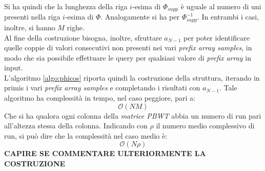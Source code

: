 Si ha quindi che la lunghezza della riga $i$-esima di $\varPhi_{supp}$ è
uguale al numero di uni presenti nella riga $i$-esima di $\varPhi$. Analogamente
si ha per $\varPhi^{-1}_{supp}$. In entrambi i casi, inoltre, si hanno $M$
righe.\\ 
Al fine della costruzione bisogna, inoltre, sfruttare $a_{N-1}$ per poter
identificare quelle coppie di valori consecutivi non presenti nei vari
\textit{prefix array samples}, in modo che sia possibile effettuare le query per
qualsiasi valore di \textit{prefix array} in input.\\
L'algoritmo \ref{algo:phicos} riporta quindi la costruzione della struttura,
iterando in primis i vari \textit{prefix array samples} e completando i
risultati con $a_{N-1}$. Tale algoritmo ha complessità in tempo, nel caso
peggiore, pari a:
\begin{equation}
  \label{eq:phicos}
  \mathcal{O}(NM)
\end{equation}
Che si ha qualora ogni colonna della \textit{matrice PBWT} abbia un numero di
run pari all'altezza stessa della colonna. Indicando con $\rho$ il numero medio
complessivo di run, si può dire che la complessità nel caso medio è:
\begin{equation}
  \label{eq:phicos2}
  \mathcal{O}(N\rho)
\end{equation}
\textbf{CAPIRE SE COMMENTARE ULTERIORMENTE LA COSTRUZIONE}\\
